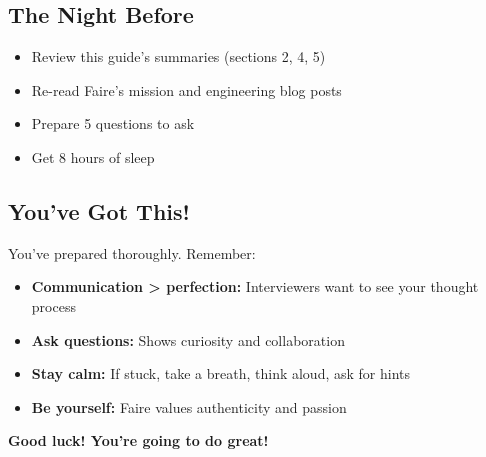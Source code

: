 \documentclass[11pt,letterpaper]{article}
\begin{document}
\subsection{The Night Before}

\begin{itemize}
    \item Review this guide's summaries (sections 2, 4, 5)
    \item Re-read Faire's mission and engineering blog posts
    \item Prepare 5 questions to ask
    \item Get 8 hours of sleep
\end{itemize}

\subsection{You've Got This!}

You've prepared thoroughly. Remember:
\begin{itemize}
    \item \textbf{Communication > perfection:} Interviewers want to see your thought process
    \item \textbf{Ask questions:} Shows curiosity and collaboration
    \item \textbf{Stay calm:} If stuck, take a breath, think aloud, ask for hints
    \item \textbf{Be yourself:} Faire values authenticity and passion
\end{itemize}

\textbf{Good luck! You're going to do great! 🚀}
\end{document}
